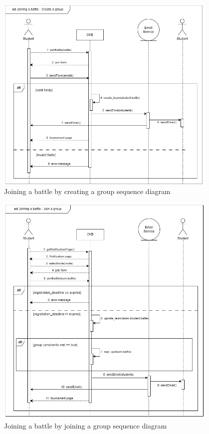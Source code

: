 \begin{figure}[H]
    \centering
    \includegraphics[width=0.95\textwidth]{images/seq_diagrams/joining_battle-create_group.png}
    \caption{Joining a battle by creating a group sequence diagram}
\end{figure}
\clearpage

\begin{figure}[H]
    \centering
    \includegraphics[width=0.95\textwidth]{images/seq_diagrams/joining_battle-join_group.png}
    \caption{Joining a battle by joining a group sequence diagram}
\end{figure}
\clearpage

